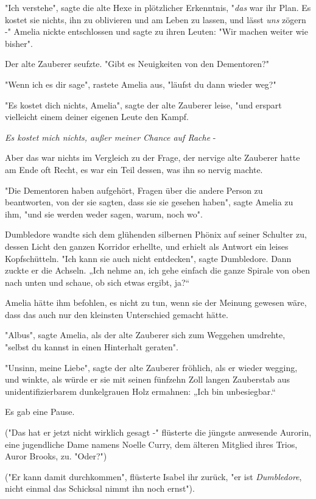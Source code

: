 {"Ich verstehe", sagte die alte Hexe in plötzlicher Erkenntnis, "\emph{das} war ihr Plan. Es kostet sie nichts, ihn zu oblivieren und am Leben zu lassen, und lässt \emph{uns} zögern -" Amelia nickte entschlossen und sagte zu ihren Leuten: "Wir machen weiter wie bisher".

Der alte Zauberer seufzte. "Gibt es Neuigkeiten von den Dementoren?"

"Wenn ich es dir sage", rastete Amelia aus, "läufst du dann wieder weg?"

"Es kostet dich nichts, Amelia", sagte der alte Zauberer leise, "und erspart vielleicht einem deiner eigenen Leute den Kampf.

\emph{Es kostet mich nichts, außer meiner Chance auf Rache} -

Aber das war nichts im Vergleich zu der Frage, der nervige alte Zauberer hatte am Ende oft Recht, es war ein Teil dessen, was ihn so nervig machte.

"Die Dementoren haben aufgehört, Fragen über die andere Person zu beantworten, von der sie sagten, dass sie sie gesehen haben", sagte Amelia zu ihm, "und sie werden weder sagen, warum, noch wo".

Dumbledore wandte sich dem glühenden silbernen Phönix auf seiner Schulter zu, dessen Licht den ganzen Korridor erhellte, und erhielt als Antwort ein leises Kopfschütteln. "Ich kann sie auch nicht entdecken", sagte Dumbledore. Dann zuckte er die Achseln. „Ich nehme an, ich gehe einfach die ganze Spirale von oben nach unten und schaue, ob sich etwas ergibt, ja?“

Amelia hätte ihm befohlen, es nicht zu tun, wenn sie der Meinung gewesen wäre, dass das auch nur den kleinsten Unterschied gemacht hätte.

"Albus", sagte Amelia, als der alte Zauberer sich zum Weggehen umdrehte, "selbst du kannst in einen Hinterhalt geraten".

"Unsinn, meine Liebe", sagte der alte Zauberer fröhlich, als er wieder wegging, und winkte, als würde er sie mit seinen fünfzehn Zoll langen Zauberstab aus unidentifizierbarem dunkelgrauen Holz ermahnen: „Ich bin unbesiegbar.“

Es gab eine Pause.

("Das hat er jetzt nicht wirklich gesagt -" flüsterte die jüngste anwesende Aurorin, eine jugendliche Dame namens Noelle Curry, dem älteren Mitglied ihres Trios, Auror Brooks, zu. "Oder?")

("Er kann damit durchkommen", flüsterte Isabel ihr zurück, "er ist \emph{Dumbledore}, nicht einmal das Schicksal nimmt ihn noch ernst").

}
